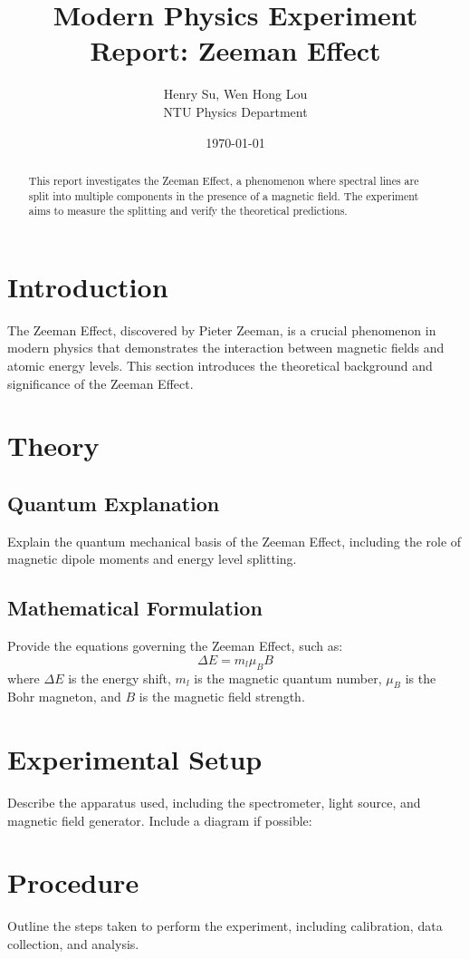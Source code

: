 \documentclass[a4paper,12pt]{article}
\title{Modern Physics Experiment Report: Zeeman Effect}
\author{Henry Su, Wen Hong Lou\\ NTU Physics Department}
\date{\today}
\begin{document}
\maketitle

\begin{abstract}
This report investigates the Zeeman Effect, a phenomenon where spectral lines are split into multiple components in the presence of a magnetic field. The experiment aims to measure the splitting and verify the theoretical predictions. 
\end{abstract}

\tableofcontents
\newpage

\section{Introduction}
The Zeeman Effect, discovered by Pieter Zeeman, is a crucial phenomenon in modern physics that demonstrates the interaction between magnetic fields and atomic energy levels. This section introduces the theoretical background and significance of the Zeeman Effect.

\section{Theory}
\subsection{Quantum Explanation}
Explain the quantum mechanical basis of the Zeeman Effect, including the role of magnetic dipole moments and energy level splitting.

\subsection{Mathematical Formulation}
Provide the equations governing the Zeeman Effect, such as:
\[
\Delta E = m_l \mu_B B
\]
where \( \Delta E \) is the energy shift, \( m_l \) is the magnetic quantum number, \( \mu_B \) is the Bohr magneton, and \( B \) is the magnetic field strength.

\section{Experimental Setup}
Describe the apparatus used, including the spectrometer, light source, and magnetic field generator. Include a diagram if possible:

\section{Procedure}
Outline the steps taken to perform the experiment, including calibration, data collection, and analysis.
\end{document}
